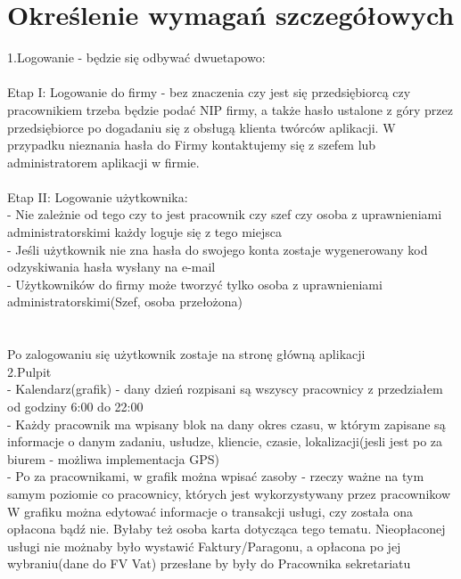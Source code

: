 \newpage
\section{Określenie wymagań szczegółowych}		%


1.Logowanie - będzie się odbywać dwuetapowo: 
\\ \\
Etap I: Logowanie do firmy - bez znaczenia czy jest się przedsiębiorcą czy pracownikiem trzeba będzie podać NIP firmy, a także hasło ustalone z góry przez przedsiębiorce po dogadaniu się z obsługą klienta twórców aplikacji. W przypadku nieznania hasła do Firmy kontaktujemy się z szefem lub administratorem aplikacji w firmie.
\\ \\ 
Etap II: Logowanie użytkownika: 
    \\ - Nie zależnie od tego czy to jest pracownik czy szef czy osoba z uprawnieniami administratorskimi każdy loguje się z tego miejsca 
    \\ - Jeśli użytkownik nie zna hasła do swojego konta zostaje wygenerowany kod odzyskiwania hasła wysłany na e-mail
    \\ - Użytkowników do firmy może tworzyć tylko osoba z uprawnieniami administratorskimi(Szef, osoba przełożona)
\\ \\ \\
Po zalogowaniu się użytkownik zostaje na stronę główną aplikacji
\\ 

2.Pulpit \\
    - Kalendarz(grafik) - dany dzień rozpisani są wszyscy pracownicy z przedziałem od godziny 6:00 do 22:00 
    \\- Każdy pracownik ma wpisany blok na dany okres czasu, w którym zapisane są informacje o danym zadaniu, usłudze, kliencie, czasie, lokalizacji(jesli jest po za biurem - możliwa implementacja GPS) 
    \\ - Po za pracownikami, w grafik można wpisać zasoby - rzeczy ważne na tym samym poziomie co pracownicy, których jest wykorzystywany przez pracownikow
    \\ W grafiku można edytować informacje o transakcji usługi, czy została ona opłacona bądź nie. Byłaby też osoba karta dotycząca tego tematu. Nieopłaconej usługi nie możnaby było wystawić Faktury/Paragonu, a opłacona po jej wybraniu(dane do FV Vat) przesłane by były do Pracownika sekretariatu
    \\ 
    
